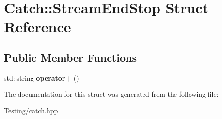 \hypertarget{struct_catch_1_1_stream_end_stop}{\section{Catch\-:\-:Stream\-End\-Stop Struct Reference}
\label{struct_catch_1_1_stream_end_stop}
}
\subsection*{Public Member Functions}
\begin{DoxyCompactItemize}
\item 
\hypertarget{struct_catch_1_1_stream_end_stop_a3025092e06c224e0845f2caa07b26d0e}{std\-::string {\bfseries operator+} ()}\label{struct_catch_1_1_stream_end_stop_a3025092e06c224e0845f2caa07b26d0e}

\end{DoxyCompactItemize}


The documentation for this struct was generated from the following file\-:\begin{DoxyCompactItemize}
\item 
Testing/catch.\-hpp\end{DoxyCompactItemize}
